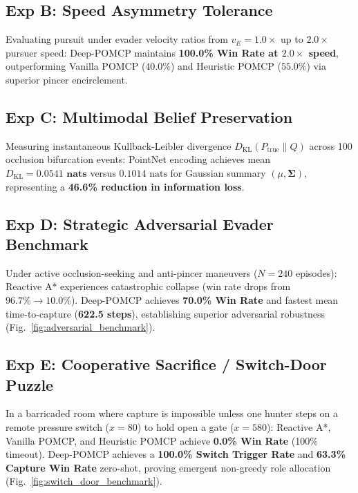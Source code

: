 \documentclass[conference]{IEEEtran}
\begin{document}
\subsection{Exp B: Speed Asymmetry Tolerance}
Evaluating pursuit under evader velocity ratios from $v_E = 1.0\times$ up to $2.0\times$ pursuer speed: Deep-POMCP maintains \textbf{100.0\% Win Rate at $2.0\times$ speed}, outperforming Vanilla POMCP ($40.0\%$) and Heuristic POMCP ($55.0\%$) via superior pincer encirclement.

\subsection{Exp C: Multimodal Belief Preservation}
Measuring instantaneous Kullback-Leibler divergence $D_{\text{KL}}(P_{\text{true}} \parallel Q)$ across 100 occlusion bifurcation events:
PointNet encoding achieves mean $D_{\text{KL}} = \mathbf{0.0541\text{ nats}}$ versus $0.1014\text{ nats}$ for Gaussian summary $(\mu, \mathbf{\Sigma})$, representing a \textbf{46.6\% reduction in information loss}.

\subsection{Exp D: Strategic Adversarial Evader Benchmark}
Under active occlusion-seeking and anti-pincer maneuvers ($N=240$ episodes): Reactive A* experiences catastrophic collapse (win rate drops from $96.7\% \to 10.0\%$). Deep-POMCP achieves \textbf{70.0\% Win Rate} and fastest mean time-to-capture (\textbf{622.5 steps}), establishing superior adversarial robustness (Fig.~\ref{fig:adversarial_benchmark}).

\subsection{Exp E: Cooperative Sacrifice / Switch-Door Puzzle}
In a barricaded room where capture is impossible unless one hunter steps on a remote pressure switch ($x=80$) to hold open a gate ($x=580$): Reactive A*, Vanilla POMCP, and Heuristic POMCP achieve \textbf{0.0\% Win Rate} (100\% timeout). Deep-POMCP achieves a \textbf{100.0\% Switch Trigger Rate} and \textbf{63.3\% Capture Win Rate} zero-shot, proving emergent non-greedy role allocation (Fig.~\ref{fig:switch_door_benchmark}).
\end{document}
